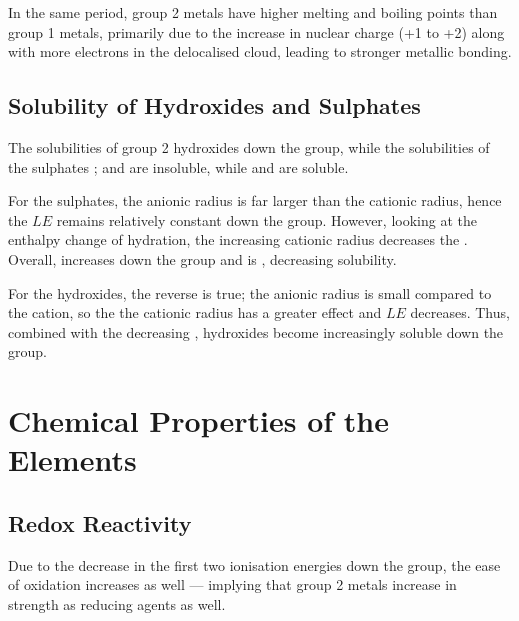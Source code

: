 				In the same period, group 2 metals have higher melting and boiling points than group 1 metals, primarily
				due to the increase in nuclear charge (+1 to +2) along with more electrons in the delocalised cloud, leading to stronger metallic
				bonding.





		\subsection{Solubility of Hydroxides and Sulphates}

			The solubilities of group 2 hydroxides  down the group, while the solubilities of the sulphates ;
			 and  are insoluble, while  and  are soluble.

			\mathdiagram{
				\[ \Menth{sol} = -LE + \Menth{hyd} \]
			}



			For the sulphates, the anionic radius is far larger than the cationic radius, hence the $LE$ remains relatively constant
			down the group. However, looking at the enthalpy change of hydration, the increasing cationic radius decreases the .
			Overall,  increases down the group and is , decreasing solubility.

			For the hydroxides, the reverse is true; the anionic radius is small compared to the cation, so the the cationic radius has a
			greater effect and $LE$ decreases. Thus, combined with the decreasing , hydroxides become increasingly soluble down the group.



	\pagebreak
	\section{Chemical Properties of the Elements}

		\subsection{Redox Reactivity}

			Due to the decrease in the first two ionisation energies down the group, the ease of oxidation increases as well --- implying that
			group 2 metals increase in strength as reducing agents as well.

